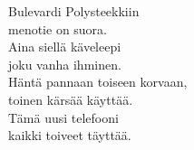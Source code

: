 
Bulevardi Polysteekkiin \\ menotie on suora. \\ Aina siellä käveleepi \\ joku vanha ihminen. \\ Häntä pannaan toiseen korvaan, \\ toinen kärsää käyttää. \\ Tämä uusi telefooni \\ kaikki toiveet täyttää.
